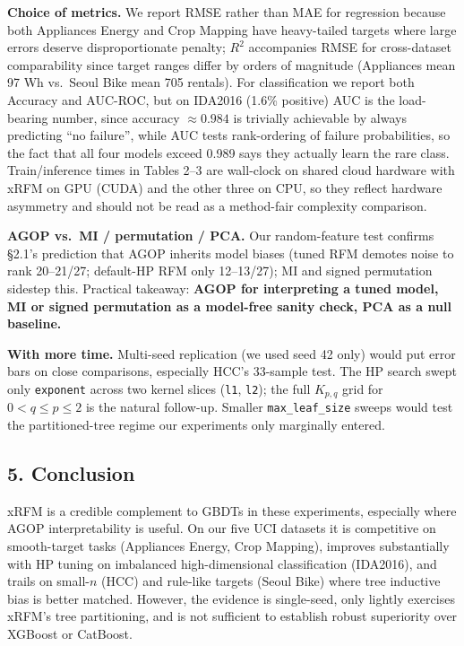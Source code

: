 \documentclass[
  11pt,
  onecolumn]{article}
\begin{document}
\textbf{Choice of metrics.} We report RMSE rather than MAE for
regression because both Appliances Energy and Crop Mapping have
heavy-tailed targets where large errors deserve disproportionate
penalty; \(R^2\) accompanies RMSE for cross-dataset comparability since
target ranges differ by orders of magnitude (Appliances mean 97 Wh
vs.~Seoul Bike mean 705 rentals). For classification we report both
Accuracy and AUC-ROC, but on IDA2016 (1.6\% positive) AUC is the
load-bearing number, since accuracy \(\approx 0.984\) is trivially
achievable by always predicting ``no failure'', while AUC tests
rank-ordering of failure probabilities, so the fact that all four
models exceed 0.989 says they actually learn the rare class.
Train/inference times in Tables 2--3 are wall-clock on shared cloud
hardware with xRFM on GPU (CUDA) and the other three on CPU, so they
reflect hardware asymmetry and should not be read as a method-fair
complexity comparison.

\textbf{AGOP vs.~MI / permutation / PCA.} Our random-feature test
confirms §2.1's prediction that AGOP inherits model biases (tuned RFM
demotes noise to rank 20--21/27; default-HP RFM only 12--13/27); MI and
signed permutation sidestep this. Practical takeaway: \textbf{AGOP for
interpreting a tuned model, MI or signed permutation as a model-free
sanity check, PCA as a null baseline.}

\textbf{With more time.} Multi-seed replication (we used seed 42 only)
would put error bars on close comparisons, especially HCC's 33-sample
test. The HP search swept only \texttt{exponent} across two kernel
slices (\texttt{l1}, \texttt{l2}); the full \(K_{p,q}\) grid for
\(0 < q \le p \le 2\) is the natural follow-up. Smaller
\texttt{max\_leaf\_size} sweeps would test the partitioned-tree regime
our experiments only marginally entered.

\subsection{5. Conclusion}\label{conclusion}

xRFM is a credible complement to GBDTs in these experiments, especially
where AGOP interpretability is useful. On our five UCI datasets it is
competitive on smooth-target tasks (Appliances Energy, Crop Mapping),
improves substantially with HP tuning on imbalanced high-dimensional
classification (IDA2016), and trails on small-\(n\) (HCC) and rule-like
targets (Seoul Bike) where tree inductive bias is better matched.
However, the evidence is single-seed, only lightly exercises xRFM's tree
partitioning, and is not sufficient to establish robust superiority over
XGBoost or CatBoost.
\end{document}
